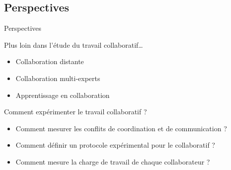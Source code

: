 \documentclass[english,french,dvips,10pt]{mybeamer}
\begin{document}
	\subsection{Perspectives}
	\begin{myframe}[label={fra-Perspectives}]{Perspectives}
		\begin{myblock}{Plus loin dans l'étude du travail collaboratif\dots}
			\begin{itemize}
				\item Collaboration distante
				\item Collaboration multi-experts
				\item Apprentissage en collaboration
			\end{itemize}
		\end{myblock}
		\begin{myblock}{Comment expérimenter le travail collaboratif ?}
			\begin{itemize}
				\item Comment mesurer les conflits de coordination et de communication ?
				\item Comment définir un protocole expérimental pour le collaboratif ?
				\item Comment mesure la charge de travail de chaque collaborateur ?
			\end{itemize}
		\end{myblock}
	\end{myframe}
\end{document}
